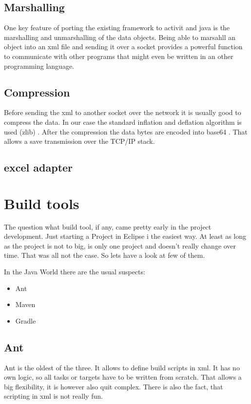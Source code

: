 \documentclass[paper=a4,twoside=false,BCOR=0mm,DIV=calc,fontsize=12pt]{scrartcl}
\begin{document}
\subsection{Marshalling}
One key feature of porting the existing framework to activit and java is the marshalling and unmarshalling of the data objects.
Being able to marsahll an object into an xml file and sending it over a socket provides a powerful function to communicate with other programs that might even be written in an other programming language.


\subsection{Compression}
Before sending the xml to another socket over the network it is usually good to compress the data.
In our case the standard inflation and deflation algorithm is used (zlib) \cite{zlib}. After the compression 
the data bytes are encoded into base64 \cite{base64}. That allows a save transmission over the TCP/IP stack.


\subsection{excel adapter}






\section{Build tools}
The question what build tool, if any, came pretty early in the project development. Just starting a Project in Eclipse i the easiest way. 
At least as long as the project is not to big, is only one project and doesn't really change over time. That was all not the case. So lets have a look at few of them. 

In the Java World there are the usual suspects:
\begin{itemize}
 \item Ant
 \item Maven
 \item Gradle
\end{itemize}

\subsection{Ant}
Ant is the oldest of the three. It allows to define build scripts in xml. 
It has no own logic, so all tasks or targets have to be written from scratch.
That allows a big flexibility, it is however also quit complex. There is also the fact,
that scripting in xml is not really fun.
\end{document}
